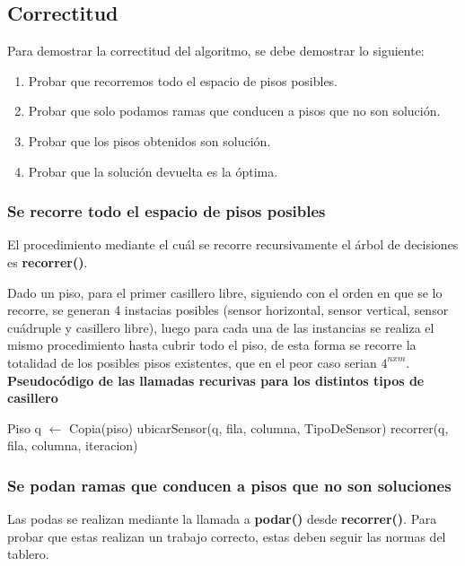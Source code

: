 \documentclass[a4paper, 10pt, twoside]{article}
\newenvironment{pseudo}[1][]{%
    \vspace{0.5em}%
    \begin{algorithmic}%
}
{%
    \end{algorithmic}%
    \vspace{0.5em}%
}
\begin{document}
\subsection{Correctitud}

Para demostrar la correctitud del algoritmo, se debe demostrar lo siguiente:
\begin{enumerate}
  \item Probar que recorremos todo el espacio de pisos posibles.
    \item Probar que solo podamos ramas que conducen a pisos que no son solución.
    \item Probar que los pisos obtenidos son solución.
    \item Probar que la solución devuelta es la óptima.
\end{enumerate}

\subsubsection{Se recorre todo el espacio de pisos posibles}

El procedimiento mediante el cuál se recorre recursivamente el árbol de decisiones es \textbf{recorrer()}.

Dado un piso, para el primer casillero libre, siguiendo con el orden en que se lo recorre, se generan 4 instacias posibles (sensor horizontal, sensor vertical, sensor cuádruple y casillero libre), luego para cada una de las instancias se realiza el mismo procedimiento hasta cubrir todo el piso, de esta forma se recorre la totalidad de los posibles pisos existentes, que en el peor caso serian $4^{nxm}$.\\


\textbf{Pseudocódigo de las llamadas recurivas para los distintos tipos de casillero}

\begin{pseudo}
  \State Piso q $\leftarrow$ Copia(piso)
    \State ubicarSensor(q, fila, columna, TipoDeSensor)
  \State recorrer(q, fila, columna, iteracion)
\end{pseudo}


\subsubsection{Se podan ramas que conducen a pisos que no son soluciones}

Las podas se realizan mediante la llamada a \textbf{podar()} desde \textbf{recorrer()}.
Para probar que estas realizan un trabajo correcto, estas deben seguir las normas del tablero.
\end{document}
